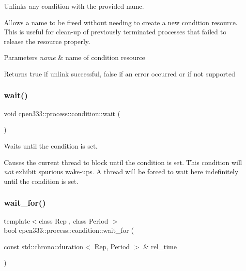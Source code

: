 Unlinks any condition with the provided name. 

Allows a name to be freed without needing to create a new condition resource. This is useful for clean-\/up of previously terminated processes that failed to release the resource properly.


\begin{DoxyParams}{Parameters}
{\em name} & name of condition resource \\
\hline
\end{DoxyParams}
\begin{DoxyReturn}{Returns}
{\ttfamily true} if unlink successful, {\ttfamily false} if an error occurred or if not supported 
\end{DoxyReturn}
\mbox{\label{classcpen333_1_1process_1_1condition_a24b3c16a8fdd333e95bf93dc07a65742}} 
\subsubsection{\texorpdfstring{wait()}{wait()}}
{\footnotesize\ttfamily void cpen333\+::process\+::condition\+::wait (\begin{DoxyParamCaption}{ }\end{DoxyParamCaption})\hspace{0.3cm}{\ttfamily [inline]}}



Waits until the condition is set. 

Causes the current thread to block until the condition is set. This condition will {\itshape not} exhibit spurious wake-\/ups. A thread will be forced to wait here indefinitely until the condition is set. \mbox{\label{classcpen333_1_1process_1_1condition_ac14bac38a3fd158af7ecf1fe5a993a40}} 
\subsubsection{\texorpdfstring{wait\+\_\+for()}{wait\_for()}}
{\footnotesize\ttfamily template$<$class Rep , class Period $>$ \\
bool cpen333\+::process\+::condition\+::wait\+\_\+for (\begin{DoxyParamCaption}\item[{const std\+::chrono\+::duration$<$ Rep, Period $>$ \&}]{rel\+\_\+time }\end{DoxyParamCaption})\hspace{0.3cm}{\ttfamily [inline]}}



